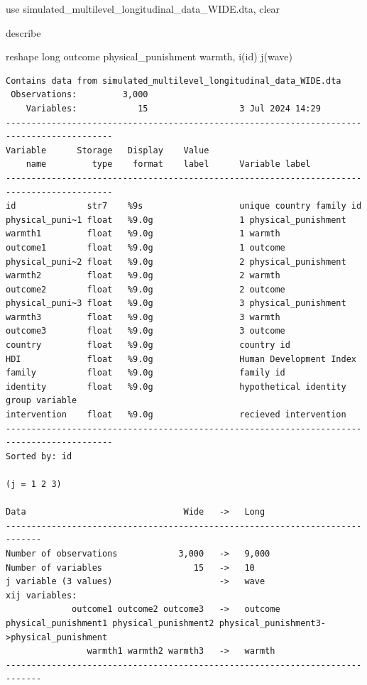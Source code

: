 \documentclass[
  letterpaper,
  DIV=11,
  numbers=noendperiod]{scrreprt}
\newenvironment{Shaded}{\begin{snugshade}}{\end{snugshade}}
\newcommand{\KeywordTok}[1]{\textcolor[rgb]{0.00,0.23,0.31}{#1}}
\newcommand{\NormalTok}[1]{\textcolor[rgb]{0.00,0.23,0.31}{#1}}
\begin{document}
\begin{Shaded}
\begin{Highlighting}[]

\KeywordTok{use}\NormalTok{ simulated\_multilevel\_longitudinal\_data\_WIDE.dta, }\KeywordTok{clear}

\KeywordTok{describe}

\KeywordTok{reshape} \KeywordTok{long}\NormalTok{ outcome physical\_punishment warmth, i(id) j(wave)}
\end{Highlighting}
\end{Shaded}

\begin{verbatim}
Contains data from simulated_multilevel_longitudinal_data_WIDE.dta
 Observations:         3,000                  
    Variables:            15                  3 Jul 2024 14:29
-------------------------------------------------------------------------------------------
Variable      Storage   Display    Value
    name         type    format    label      Variable label
-------------------------------------------------------------------------------------------
id              str7    %9s                   unique country family id
physical_puni~1 float   %9.0g                 1 physical_punishment
warmth1         float   %9.0g                 1 warmth
outcome1        float   %9.0g                 1 outcome
physical_puni~2 float   %9.0g                 2 physical_punishment
warmth2         float   %9.0g                 2 warmth
outcome2        float   %9.0g                 2 outcome
physical_puni~3 float   %9.0g                 3 physical_punishment
warmth3         float   %9.0g                 3 warmth
outcome3        float   %9.0g                 3 outcome
country         float   %9.0g                 country id
HDI             float   %9.0g                 Human Development Index
family          float   %9.0g                 family id
identity        float   %9.0g                 hypothetical identity group variable
intervention    float   %9.0g                 recieved intervention
-------------------------------------------------------------------------------------------
Sorted by: id

(j = 1 2 3)

Data                               Wide   ->   Long
-----------------------------------------------------------------------------
Number of observations            3,000   ->   9,000       
Number of variables                  15   ->   10          
j variable (3 values)                     ->   wave
xij variables:
             outcome1 outcome2 outcome3   ->   outcome
physical_punishment1 physical_punishment2 physical_punishment3->physical_punishment
                warmth1 warmth2 warmth3   ->   warmth
-----------------------------------------------------------------------------
\end{verbatim}
\end{document}
